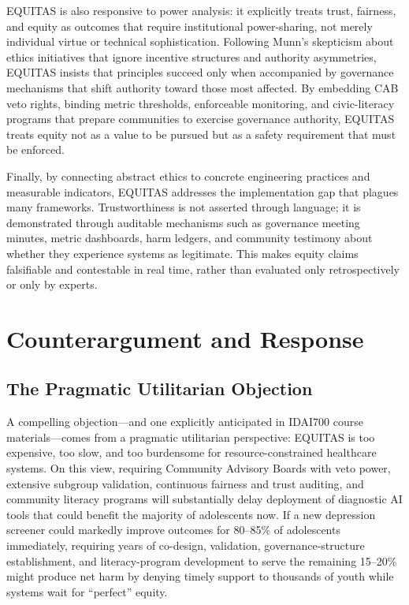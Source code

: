 \documentclass[12pt,letterpaper]{article}
\begin{document}
EQUITAS is also responsive to power analysis: it explicitly treats trust, fairness, and equity as outcomes that require institutional power-sharing, not merely individual virtue or technical sophistication. Following Munn's skepticism about ethics initiatives that ignore incentive structures and authority asymmetries, EQUITAS insists that principles succeed only when accompanied by governance mechanisms that shift authority toward those most affected.\cite{munn_idai700} By embedding CAB veto rights, binding metric thresholds, enforceable monitoring, and civic-literacy programs that prepare communities to exercise governance authority, EQUITAS treats equity not as a value to be pursued but as a safety requirement that must be enforced.\cite{lekadir2025}

Finally, by connecting abstract ethics to concrete engineering practices and measurable indicators, EQUITAS addresses the implementation gap that plagues many frameworks. Trustworthiness is not asserted through language; it is demonstrated through auditable mechanisms such as governance meeting minutes, metric dashboards, harm ledgers, and community testimony about whether they experience systems as legitimate.\cite{sagona2025} This makes equity claims falsifiable and contestable in real time, rather than evaluated only retrospectively or only by experts.

\section{Counterargument and Response}

\subsection{The Pragmatic Utilitarian Objection}

A compelling objection---and one explicitly anticipated in IDAI700 course materials---comes from a pragmatic utilitarian perspective: EQUITAS is too expensive, too slow, and too burdensome for resource-constrained healthcare systems.\cite{munn_idai700} On this view, requiring Community Advisory Boards with veto power, extensive subgroup validation, continuous fairness and trust auditing, and community literacy programs will substantially delay deployment of diagnostic AI tools that could benefit the majority of adolescents now. If a new depression screener could markedly improve outcomes for 80--85\% of adolescents immediately, requiring years of co-design, validation, governance-structure establishment, and literacy-program development to serve the remaining 15--20\% might produce net harm by denying timely support to thousands of youth while systems wait for ``perfect'' equity.\cite{munn_idai700}
\end{document}

